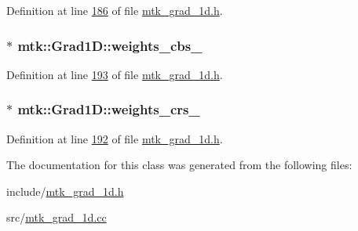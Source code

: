 Definition at line \hyperlink{mtk__grad__1d_8h_source_l00186}{186} of file \hyperlink{mtk__grad__1d_8h_source}{mtk\-\_\-grad\-\_\-1d.\-h}.

\hypertarget{classmtk_1_1Grad1D_ae6b0a908748923b2acd97e5bf7acc000}{
\subsubsection[{weights\-\_\-cbs\-\_\-}]{$\ast$ mtk\-::\-Grad1\-D\-::weights\-\_\-cbs\-\_\-\hspace{0.3cm}{\ttfamily [private]}}}\label{classmtk_1_1Grad1D_ae6b0a908748923b2acd97e5bf7acc000}


Definition at line \hyperlink{mtk__grad__1d_8h_source_l00193}{193} of file \hyperlink{mtk__grad__1d_8h_source}{mtk\-\_\-grad\-\_\-1d.\-h}.

\hypertarget{classmtk_1_1Grad1D_a96914abea78528b32499963ce9bbe4a6}{
\subsubsection[{weights\-\_\-crs\-\_\-}]{$\ast$ mtk\-::\-Grad1\-D\-::weights\-\_\-crs\-\_\-\hspace{0.3cm}{\ttfamily [private]}}}\label{classmtk_1_1Grad1D_a96914abea78528b32499963ce9bbe4a6}


Definition at line \hyperlink{mtk__grad__1d_8h_source_l00192}{192} of file \hyperlink{mtk__grad__1d_8h_source}{mtk\-\_\-grad\-\_\-1d.\-h}.



The documentation for this class was generated from the following files\-:\begin{DoxyCompactItemize}
\item 
include/\hyperlink{mtk__grad__1d_8h}{mtk\-\_\-grad\-\_\-1d.\-h}\item 
src/\hyperlink{mtk__grad__1d_8cc}{mtk\-\_\-grad\-\_\-1d.\-cc}\end{DoxyCompactItemize}
